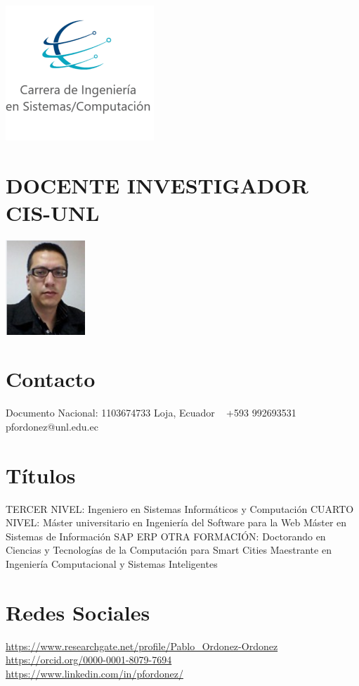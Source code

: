 \documentclass[]{cv-style} %
\begin{document}
\begin{aside}
\includegraphics[scale=0.5]{logoCOMP.png}
\section{DOCENTE INVESTIGADOR {CIS-UNL}} %
\includegraphics[width=3cm]{foto}
\section{Contacto}
Documento Nacional: 1103674733
Loja, Ecuador
~
+593 992693531
~
pfordonez@unl.edu.ec
~
\section{Títulos}
TERCER NIVEL:
Ingeniero en Sistemas Informáticos y Computación
CUARTO NIVEL:
Máster universitario en Ingeniería del Software para la Web
Máster en Sistemas de Información SAP ERP
OTRA FORMACIÓN:
Doctorando en Ciencias y Tecnologías de la Computación para Smart Cities
Maestrante en Ingeniería Computacional y Sistemas Inteligentes 
~
\section{Redes Sociales}

\small
\url{https://www.researchgate.net/profile/Pablo_Ordonez-Ordonez}
~
\url{https://orcid.org/0000-0001-8079-7694}
~
\url{https://www.linkedin.com/in/pfordonez/}
~


\end{aside}
\small
\end{document}
